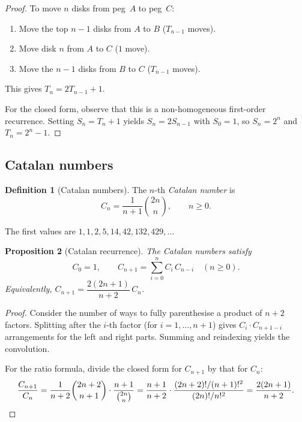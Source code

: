 \documentclass[12pt,a4paper,openany]{book}
\theoremstyle{definition}
\newtheorem{definition}{Definition}[chapter]
\theoremstyle{plain}
\newtheorem{proposition}[definition]{Proposition}
\theoremstyle{remark}
\begin{document}
\begin{proof}
To move $n$ disks from peg~$A$ to peg~$C$:
\begin{enumerate}
\item Move the top $n-1$ disks from $A$ to $B$ ($T_{n-1}$ moves).
\item Move disk $n$ from $A$ to $C$ ($1$ move).
\item Move the $n-1$ disks from $B$ to $C$ ($T_{n-1}$ moves).
\end{enumerate}
This gives $T_n = 2T_{n-1} + 1$.

For the closed form, observe that this is a non-homogeneous first-order
recurrence.  Setting $S_n = T_n + 1$ yields $S_n = 2S_{n-1}$ with
$S_0 = 1$, so $S_n = 2^n$ and $T_n = 2^n - 1$.
\end{proof}

\subsection{Catalan numbers}\label{ssec:catalan}

\begin{definition}[Catalan numbers]\label{def:catalan}
The $n$-th \emph{Catalan number} is
\[
   C_n = \frac{1}{n+1}\binom{2n}{n}, \qquad n \ge 0.
\]
\end{definition}

The first values are $1, 1, 2, 5, 14, 42, 132, 429, \dots$

\begin{proposition}[Catalan recurrence]\label{prop:catalan-rec}
The Catalan numbers satisfy
\[
   C_0 = 1, \qquad
   C_{n+1} = \sum_{i=0}^{n} C_i\, C_{n-i} \quad (n \ge 0).
\]
Equivalently, $C_{n+1} = \dfrac{2(2n+1)}{n+2}\, C_n$.
\end{proposition}

\begin{proof}
Consider the number of ways to fully parenthesise a product of $n+2$
factors.  Splitting after the $i$-th factor (for $i = 1, \dots, n+1$)
gives $C_i \cdot C_{n+1-i}$ arrangements for the left and right parts.
Summing and reindexing yields the convolution.

For the ratio formula, divide the closed form for $C_{n+1}$ by that
for $C_n$:
\[
   \frac{C_{n+1}}{C_n}
   = \frac{1}{n+2}\binom{2n+2}{n+1}
     \cdot \frac{n+1}{\binom{2n}{n}}
   = \frac{n+1}{n+2}\cdot\frac{(2n+2)!/(n+1)!^2}{(2n)!/n!^2}
   = \frac{2(2n+1)}{n+2}. \qedhere
\]
\end{proof}
\end{document}

